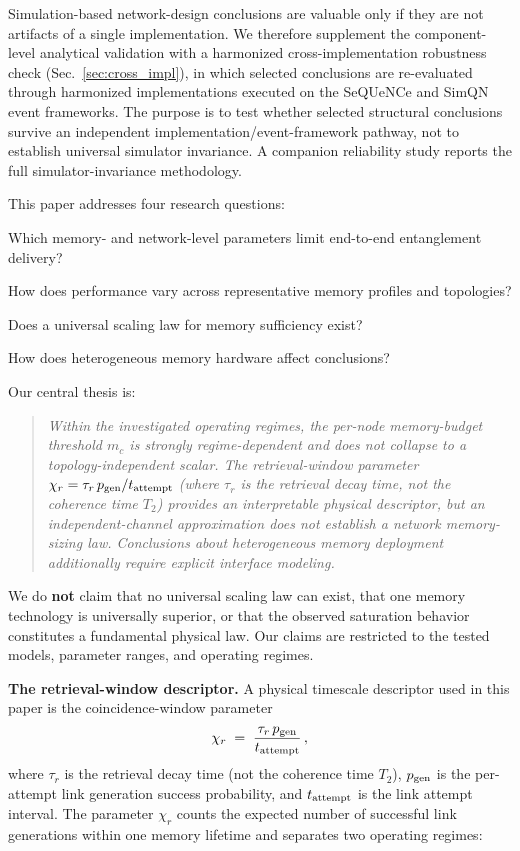 \documentclass[quantumrep,article,submit,moreauthors]{Definitions/mdpi}
\begin{document}
Simulation-based network-design conclusions are valuable only if they are not artifacts of a single implementation. We therefore supplement the component-level analytical validation with a harmonized cross-implementation robustness check (Sec.~\ref{sec:cross_impl}), in which selected conclusions are re-evaluated through harmonized implementations executed on the SeQUeNCe and SimQN event frameworks. The purpose is to test whether selected structural conclusions survive an independent implementation/event-framework pathway, not to establish universal simulator invariance. A companion reliability study reports the full simulator-invariance methodology.

This paper addresses four research questions:

\begin{description}[leftmargin=2em]
\item[\textbf{RQ-A1}] Which memory- and network-level parameters limit end-to-end entanglement delivery?
\item[\textbf{RQ-A2}] How does performance vary across representative memory profiles and topologies?
\item[\textbf{RQ-A3}] Does a universal scaling law for memory sufficiency exist?
\item[\textbf{RQ-A4}] How does heterogeneous memory hardware affect conclusions?
\end{description}

Our central thesis is:
\begin{quote}
\textit{Within the investigated operating regimes, the per-node memory-budget threshold $m_c$ is strongly regime-dependent and does not collapse to a topology-independent scalar. The retrieval-window parameter $\chi_r = \tau_r\, p_{\rm gen} / t_{\rm attempt}$ (where $\tau_r$ is the retrieval decay time, not the coherence time $T_2$) provides an interpretable physical descriptor, but an independent-channel approximation does not establish a network memory-sizing law. Conclusions about heterogeneous memory deployment additionally require explicit interface modeling.}
\end{quote}

We do \textbf{not} claim that no universal scaling law can exist, that one memory technology is universally superior, or that the observed saturation behavior constitutes a fundamental physical law. Our claims are restricted to the tested models, parameter ranges, and operating regimes.

\textbf{The retrieval-window descriptor.} A physical timescale descriptor used in this paper is the coincidence-window parameter
\begin{equation}
\chi_r \;=\; \frac{\tau_r\, p_{\rm gen}}{t_{\rm attempt}} \,,
\label{eq:chi}
\end{equation}
where $\tau_r$ is the retrieval decay time (not the coherence time $T_2$), $p_{\rm gen}$ is the per-attempt link generation success probability, and $t_{\rm attempt}$ is the link attempt interval. The parameter $\chi_r$ counts the expected number of successful link generations within one memory lifetime and separates two operating regimes:
\end{document}
